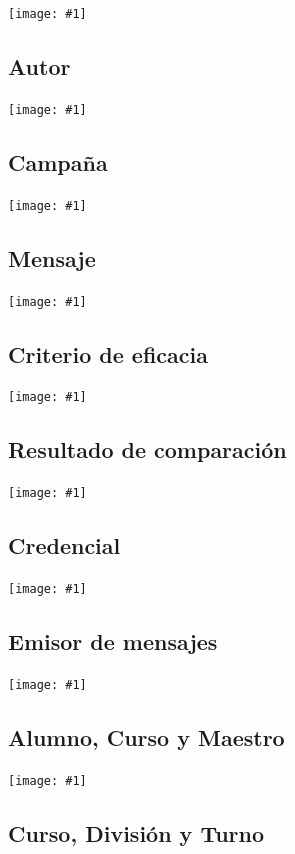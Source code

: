 \documentclass[a4paper, 10pt, twoside]{article}
\newcommand{\grafico}[1]{
  \begin{center}
    \texttt{[image: \#1]}
  \end{center}
}
\begin{document}
\grafico{diagramas/evento.pdf}


\subsection{Autor}

\grafico{diagramas/autor.pdf}


\subsection{Campaña}

\grafico{diagramas/campania.pdf}


\subsection{Mensaje}

\grafico{diagramas/mensaje.pdf}


\subsection{Criterio de eficacia}

\grafico{diagramas/criterioDeEficacia.pdf}


\subsection{Resultado de comparación}

\grafico{diagramas/resultadoDeComparacion.pdf}


\subsection{Credencial}

\grafico{diagramas/credencial.pdf}


\subsection{Emisor de mensajes}

\grafico{diagramas/emisorDeMensajes.pdf}


\subsection{Alumno, Curso y Maestro}

\grafico{diagramas/alumnoCursoMaestro.pdf}


\subsection{Curso, División y Turno}
\end{document}
